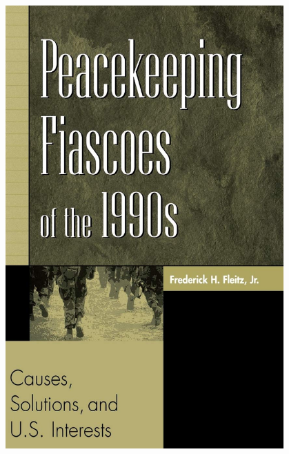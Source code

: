 \documentclass[aspectratio=43]{beamer}
\begin{document}
\begin{frame}
\begin{minipage}{0.49\textwidth}
\includegraphics[width = 0.8\textwidth]{img/pk-fiascoes}\\
\end{minipage}

\end{frame}


\end{document}
